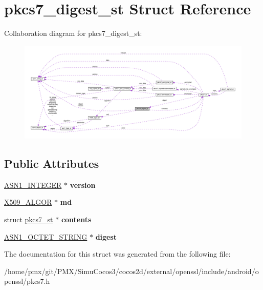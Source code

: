 \hypertarget{structpkcs7__digest__st}{}\section{pkcs7\+\_\+digest\+\_\+st Struct Reference}
\label{structpkcs7__digest__st}


Collaboration diagram for pkcs7\+\_\+digest\+\_\+st\+:
\nopagebreak
\begin{figure}[H]
\begin{center}
\leavevmode
\includegraphics[width=350pt]{structpkcs7__digest__st__coll__graph}
\end{center}
\end{figure}
\subsection*{Public Attributes}
\begin{DoxyCompactItemize}
\item 
\mbox{\label{structpkcs7__digest__st_a078d07c2ee418eb87e3e4154384269ff}} 
\hyperlink{structasn1__string__st}{A\+S\+N1\+\_\+\+I\+N\+T\+E\+G\+ER} $\ast$ {\bfseries version}
\item 
\mbox{\label{structpkcs7__digest__st_a01e51eff2474232a8dfed7a7c0560cb2}} 
\hyperlink{structX509__algor__st}{X509\+\_\+\+A\+L\+G\+OR} $\ast$ {\bfseries md}
\item 
\mbox{\label{structpkcs7__digest__st_a22424964473b262eae1d126652865590}} 
struct \hyperlink{structpkcs7__st}{pkcs7\+\_\+st} $\ast$ {\bfseries contents}
\item 
\mbox{\label{structpkcs7__digest__st_a2560770dbb31b4255b97da3345cd7acb}} 
\hyperlink{structasn1__string__st}{A\+S\+N1\+\_\+\+O\+C\+T\+E\+T\+\_\+\+S\+T\+R\+I\+NG} $\ast$ {\bfseries digest}
\end{DoxyCompactItemize}


The documentation for this struct was generated from the following file\+:\begin{DoxyCompactItemize}
\item 
/home/pmx/git/\+P\+M\+X/\+Simu\+Cocos3/cocos2d/external/openssl/include/android/openssl/pkcs7.\+h\end{DoxyCompactItemize}
